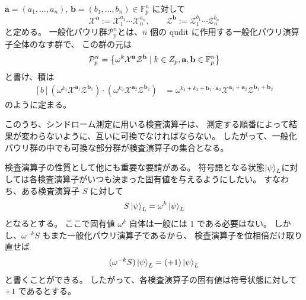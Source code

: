 \documentclass[../master.tex]{subfiles}
\begin{document}
\begin{NoteBox}[title={一般化パウリ群}]{}
    $\mathbf a=(a_1,\dots,a_n),\, \mathbf b=(b_1,\dots,b_n)\in\mathbb F_p^n$
    に対して
    \begin{equation}
        \mathcal X^{\mathbf a}:=\mathcal X_1^{a_1}\cdots \mathcal X_n^{a_n},\qquad
        \mathcal Z^{\mathbf b}:=\mathcal Z_1^{b_1}\cdots \mathcal Z_n^{b_n}
    \end{equation}
    と定める。
    一般化パウリ群$\mathcal{P}_p^n$とは、$n$ 個の qudit に作用する一般化パウリ演算子全体のなす群で、
    この群の元は
    \begin{equation}\begin{aligned}[b]
        \mathcal{P}_p^n=
        \qty{
            \omega^k \mathcal{X}^{\mathbf{a}}\mathcal{Z}^{\mathbf{b}}
            \mid k\in  Z_p,  \mathbf{a},\mathbf{b}\in \mathbb{F}_p^n }
    \end{aligned}\end{equation}
    と書け、積は
    \begin{equation}\begin{aligned}[b]
        (\omega^{k_1} \mathcal{X}^{\mathbf{a}_1}\mathcal{Z}^{\mathbf{b}_1})\cdot
        (\omega^{k_2} \mathcal{X}^{\mathbf{a}_2}\mathcal{Z}^{\mathbf{b}_2})
        &=
        \omega^{k_1+k_2+\mathbf{b}_1\cdot\mathbf{a}_2}
        \mathcal{X}^{\mathbf{a}_1+\mathbf{a}_2}\mathcal{Z}^{\mathbf{b}_1+\mathbf{b}_2}
    \end{aligned}\end{equation}
    のように定まる。
\end{NoteBox}

このうち、シンドローム測定に用いる検査演算子は、
測定する順番によって結果が変わらないように、互いに可換でなければならない。
したがって、一般化パウリ群の中でも可換な部分群が検査演算子の集合となる。

検査演算子の性質として他にも重要な要請がある。
符号語となる状態$\ket{\psi}_L$に対しては各検査演算子がいつも決まった固有値を与えるようにしたい。
すなわち、ある検査演算子 $S$ に対して
\begin{equation}
   S\ket{\psi}_L=\omega^k\ket{\psi}_L
\end{equation}
となるとする。
ここで固有値 $\omega^k$ 自体は一般には $1$ である必要はない。
しかし、$\omega^{-k}S$ もまた一般化パウリ演算子であるから、
検査演算子を位相倍だけ取り直せば
\begin{equation}
    (\omega^{-k}S)\ket{\psi}_L=(+1)\ket{\psi}_L
\end{equation}
と書くことができる。
したがって、各検査演算子の固有値は符号状態に対して $+1$ であるとする。
\end{document}
